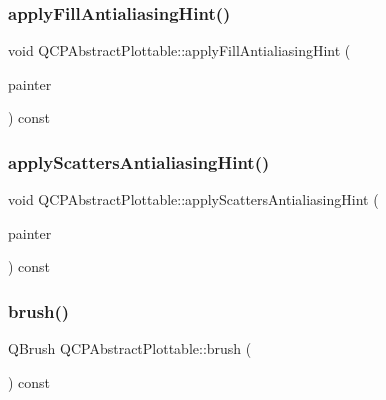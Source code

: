 \subsubsection{\texorpdfstring{applyFillAntialiasingHint()}{applyFillAntialiasingHint()}}
{\footnotesize\ttfamily void Q\+C\+P\+Abstract\+Plottable\+::apply\+Fill\+Antialiasing\+Hint (\begin{DoxyParamCaption}\item[{\mbox{\hyperlink{class_q_c_p_painter}{Q\+C\+P\+Painter}} $\ast$}]{painter }\end{DoxyParamCaption}) const\hspace{0.3cm}{\ttfamily [protected]}}

\mbox{\label{class_q_c_p_abstract_plottable_ac95f26b15a1e5d9c7bd2c0a46d760fc9}} 
\subsubsection{\texorpdfstring{applyScattersAntialiasingHint()}{applyScattersAntialiasingHint()}}
{\footnotesize\ttfamily void Q\+C\+P\+Abstract\+Plottable\+::apply\+Scatters\+Antialiasing\+Hint (\begin{DoxyParamCaption}\item[{\mbox{\hyperlink{class_q_c_p_painter}{Q\+C\+P\+Painter}} $\ast$}]{painter }\end{DoxyParamCaption}) const\hspace{0.3cm}{\ttfamily [protected]}}

\mbox{\label{class_q_c_p_abstract_plottable_a893b4896dfd92b68b05b2600b80f5826}} 
\subsubsection{\texorpdfstring{brush()}{brush()}}
{\footnotesize\ttfamily Q\+Brush Q\+C\+P\+Abstract\+Plottable\+::brush (\begin{DoxyParamCaption}{ }\end{DoxyParamCaption}) const\hspace{0.3cm}{\ttfamily [inline]}}

